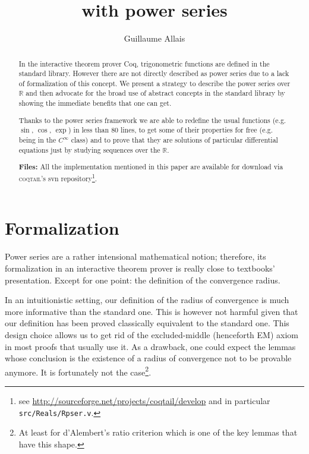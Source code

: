 \documentclass[submission,copyright]{eptcs}
\title{\coq{} with power series}
\author{Guillaume Allais
\institute{Junior Laboratory \coqtail{}\\
Ens Lyon - France\\}
\email{guillaume.allais@ens-lyon.org}}
\newcommand{\coq}{Coq}
\newcommand{\coqtail}{\textsc{coqtail}}
\newcommand{\R}{\mathbb{R}}
\begin{document}
\maketitle

\begin{abstract}
In the interactive theorem prover \coq{}\cite{coq}, trigonometric
functions are defined in the standard library. However there are not
directly described as power series  due to a lack of formalization of
this concept. We present a strategy to describe the power series over
$\R$ and then advocate for the broad use of abstract concepts in the
standard library by showing the immediate benefits that one can get.

Thanks to the power series framework we are able to redefine the usual
functions (e.g. $\sin$, $\cos$, $\exp$) in less than 80 lines,
to get some of their properties for free (e.g. being in the $C^{\infty}$
class) and to prove that they are solutions of particular differential
equations just by studying sequences over the $\R$.

\textbf{Files:} All the implementation mentioned in this paper are
available for download via \coqtail{}'s svn repository\footnote{see
\url{http://sourceforge.net/projects/coqtail/develop}
and in particular \texttt{src/Reals/Rpser.v}.}.

\end{abstract}

\section{Formalization}

Power series are a rather intensional mathematical notion; therefore, its 
formalization in an interactive theorem prover is really close to  
textbooks' presentation. Except for one point: the definition of the
convergence radius.

In an intuitionistic setting, our definition of the radius of convergence
is much more informative than the standard one.  This is however not
harmful given that our definition has been proved classically equivalent
to the standard one. This design choice allows us to get rid of the
excluded-middle (henceforth EM) axiom in most proofs that usually use
it. As a drawback, one could expect the lemmas whose conclusion is the
existence of a radius of convergence not to be provable anymore. It is
fortunately not the case\footnote{At least for d'Alembert's ratio criterion
which is one of the key lemmas that have this shape.}.
\end{document}
